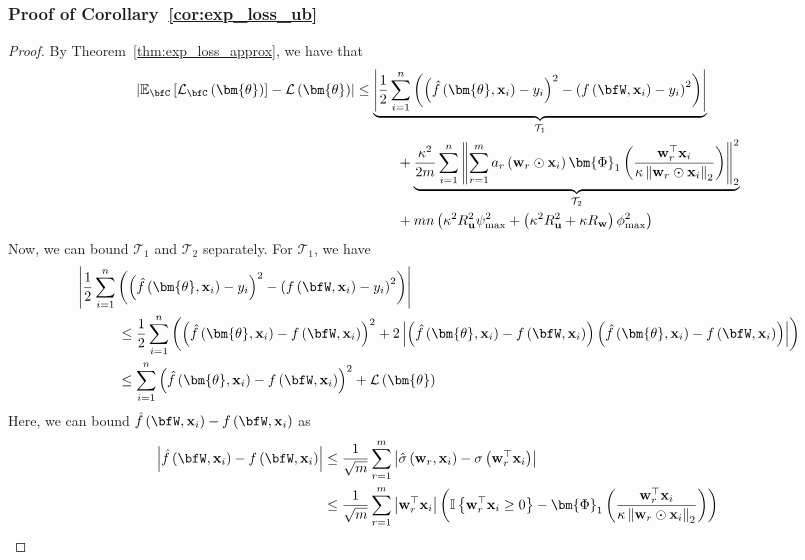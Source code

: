 \documentclass[10pt]{article} %
\theoremstyle{definition}
\theoremstyle{plain}
\newcommand{\paren}[1]{\left(#1\right)}
\newcommand{\norm}[1]{\left\|#1\right\|}
\newcommand{\indy}[1]{\mathbb{I}\left\{#1\right\}}
\providecommand{\E}{\mathbb{E}}
\def\calL{{\mathcal{L}}}
\def\bfu{{\mathbf{u}}}\def\bfv{{\mathbf{v}}}\def\bfw{{\mathbf{w}}}\def\bfx{{\mathbf{x}}}
\begin{document}
\subsubsection{Proof of Corollary~\ref{cor:exp_loss_ub}}
\begin{proof}
    By Theorem~\ref{thm:exp_loss_approx}, we have that 
    \begin{align*}
        \left|\E_{\bfC}\left[\calL_{\bfC}\paren{\bm{\theta}}\right] - \calL\paren{\bm{\theta}}\right| & \leq \underbrace{\left|\frac{1}{2}\sum_{i=1}^n\paren{\paren{\hat{f}\paren{\bm{\theta},\bfx_i} - y_i}^2 - \paren{{f}\paren{\bfW,\bfx_i} - y_i}^2}\right|}_{\mathcal{T}_1}\\
        &\quad\quad\quad + \underbrace{\frac{\kappa^2}{2m}\sum_{i=1}^n\norm{\sum_{r=1}^ma_r\paren{\bfw_r\odot\bfx_i}\bm{\Phi}_1\paren{\frac{\bfw_r^\top\bfx_i}{\kappa\norm{\bfw_r\odot\bfx_i}_2}}}_2^2}_{\mathcal{T}_2}\\
        & \quad\quad\quad + mn\paren{\kappa^2R_{\bfu}^2\psi_{\max}^2 + \paren{\kappa^2R_{\bfu}^2 + \kappa R_{\bfw}}\phi_{\max}^2}
    \end{align*}
    Now, we can bound $\mathcal{T}_1$ and $\mathcal{T}_2$ separately. For $\mathcal{T}_1$, we have
    \begin{align*}
        & \left|\frac{1}{2}\sum_{i=1}^n\paren{\paren{\hat{f}\paren{\bm{\theta},\bfx_i} - y_i}^2 - \paren{{f}\paren{\bfW,\bfx_i} - y_i}^2}\right| \\
        & \quad\quad\quad \leq \frac{1}{2}\sum_{i=1}^n\paren{\paren{\hat{f}\paren{\bm{\theta},\bfx_i} - {f}\paren{\bfW,\bfx_i}}^2 + 2\left|\paren{\hat{f}\paren{\bm{\theta},\bfx_i} - {f}\paren{\bfW,\bfx_i}}\paren{\hat{f}\paren{\bm{\theta},\bfx_i} - {f}\paren{\bfW,\bfx_i}}\right|}\\
        & \quad\quad\quad \leq\sum_{i=1}^n\paren{\hat{f}\paren{\bm{\theta},\bfx_i} - {f}\paren{\bfW,\bfx_i}}^2 + \calL\paren{\bm{\theta}}
    \end{align*}
    Here, we can bound $\hat{f}\paren{\bfW,\bfx_i} - {f}\paren{\bfW,\bfx_i}$ as
    \begin{align*}
        \left|\hat{f}\paren{\bfW,\bfx_i} - {f}\paren{\bfW,\bfx_i}\right| & \leq \frac{1}{\sqrt{m}}\sum_{r=1}^m\left|\hat{\sigma}\paren{\bfw_r,\bfx_i} - \sigma\paren{\bfw_r^\top\bfx_i}\right|\\
        & \leq \frac{1}{\sqrt{m}}\sum_{r=1}^m\left|\bfw_r^\top\bfx_i\right|\paren{\indy{\bfw_r^\top\bfx_i\geq 0} - \bm{\Phi}_1\paren{\frac{\bfw_r^\top\bfx_i}{\kappa\norm{\bfw_r\odot\bfx_i}_2}}}\\

\end{align*}
\end{proof}
\end{document}
